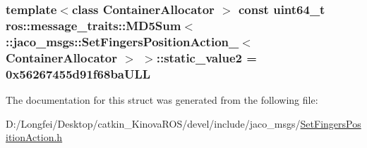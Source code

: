\subsubsection[{\texorpdfstring{static\+\_\+value2}{static_value2}}]{\setlength{\rightskip}{0pt plus 5cm}template$<$class Container\+Allocator $>$ const uint64\+\_\+t ros\+::message\+\_\+traits\+::\+M\+D5\+Sum$<$ \+::{\bf jaco\+\_\+msgs\+::\+Set\+Fingers\+Position\+Action\+\_\+}$<$ Container\+Allocator $>$ $>$\+::static\+\_\+value2 = 0x56267455d91f68ba\+U\+LL\hspace{0.3cm}{\ttfamily [static]}}\hypertarget{structros_1_1message__traits_1_1MD5Sum_3_01_1_1jaco__msgs_1_1SetFingersPositionAction___3_01ContainerAllocator_01_4_01_4_af5f845032d3179f4fbac488b5a6ae424}{}\label{structros_1_1message__traits_1_1MD5Sum_3_01_1_1jaco__msgs_1_1SetFingersPositionAction___3_01ContainerAllocator_01_4_01_4_af5f845032d3179f4fbac488b5a6ae424}


The documentation for this struct was generated from the following file\+:\begin{DoxyCompactItemize}
\item 
D\+:/\+Longfei/\+Desktop/catkin\+\_\+\+Kinova\+R\+O\+S/devel/include/jaco\+\_\+msgs/\hyperlink{SetFingersPositionAction_8h}{Set\+Fingers\+Position\+Action.\+h}\end{DoxyCompactItemize}
